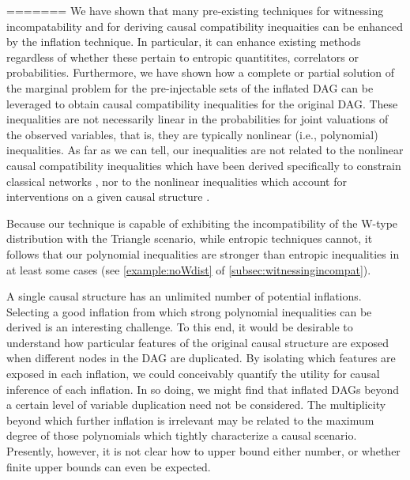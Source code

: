 {=======
We have shown that many pre-existing techniques for witnessing incompatability and for deriving causal compatibility inequaities can be enhanced by the inflation technique.  In particular, it can enhance existing methods regardless of whether these pertain to entropic quantitites, correlators or probabilities.  Furthermore, we have shown how a complete or partial solution of the marginal problem for the pre-injectable sets of the inflated DAG can be leveraged to obtain causal compatibility inequalities  for the original DAG.  These inequalities are not necessarily linear in the probabilities for joint valuations of the observed variables, that is, they are typically nonlinear (i.e., polynomial) inequalities.  As far as we can tell, our inequalities are not related to the nonlinear causal compatibility inequalities which have been derived specifically to constrain classical networks \cite{TavakoliStarNetworks,RossetNetworks,TavakoliNoncyclicNetworks}, nor to the nonlinear inequalities which account for interventions on a given causal structure \cite{kang2007polynomialconstraints,steeg2011relaxation}.

Because our technique is capable of exhibiting the incompatibility of the W-type distribution with the Triangle scenario, while entropic techniques cannot, it follows that our polynomial inequalities are stronger than entropic inequalities in at least some cases (see \cref{example:noWdist} of \cref{subsec:witnessingincompat}).   

A single causal structure has an unlimited number of potential inflations. Selecting a good inflation from which strong polynomial inequalities can be derived is an interesting challenge. To this end, it would be desirable to understand how particular features of the original causal structure are exposed when different nodes in the DAG are duplicated. By isolating which features are exposed in each inflation, we could conceivably quantify the utility for causal inference of each inflation. In so doing, we might find that inflated DAGs beyond a certain level of variable duplication need not be considered. The multiplicity beyond which further inflation is irrelevant may be related to the maximum degree of those polynomials which tightly characterize a causal scenario. Presently, however, it is not clear how to upper bound either number, or whether finite upper bounds can even be expected.


}
